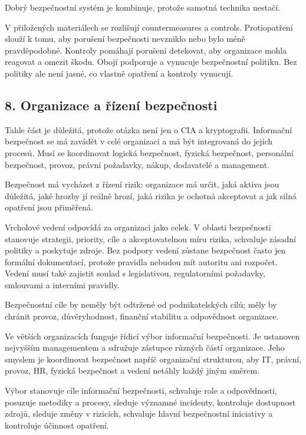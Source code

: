 Dobrý bezpečnostní systém je kombinuje, protože samotná technika nestačí.

V přiložených materiálech se rozlišují countermeasures a controls. Protiopatření slouží k tomu, aby porušení bezpečnosti nevzniklo nebo bylo méně pravděpodobné. Kontroly pomáhají porušení detekovat, aby organizace mohla reagovat a omezit škodu. Obojí podporuje a vynucuje bezpečnostní politiku. Bez politiky ale není jasné, co vlastně opatření a kontroly vynucují.

\subsection*{8. Organizace a řízení bezpečnosti}

Tahle část je důležitá, protože otázka není jen o CIA a kryptografii. Informační bezpečnost se má zavádět v celé organizaci a má být integrovaná do jejích procesů. Musí se koordinovat logická bezpečnost, fyzická bezpečnost, personální bezpečnost, provoz, právní požadavky, nákup, dodavatelé a management.

Bezpečnost má vycházet z řízení rizik: organizace má určit, jaká aktiva jsou důležitá, jaké hrozby jí reálně hrozí, jaká rizika je ochotná akceptovat a jak silná opatření jsou přiměřená.

Vrcholové vedení odpovídá za organizaci jako celek. V oblasti bezpečnosti stanovuje strategii, priority, cíle a akceptovatelnou míru rizika, schvaluje zásadní politiky a poskytuje zdroje. Bez podpory vedení zůstane bezpečnost často jen formální dokumentací, protože pravidla nebudou mít autoritu ani rozpočet. Vedení musí také zajistit soulad s legislativou, regulatorními požadavky, smlouvami a interními pravidly.

Bezpečnostní cíle by neměly být odtržené od podnikatelských cílů; měly by chránit provoz, důvěryhodnost, finanční stabilitu a odpovědnost organizace.

Ve větších organizacích funguje řídicí výbor informační bezpečnosti. Je ustanoven nejvyšším managementem a sdružuje zástupce různých částí organizace. Jeho smyslem je koordinovat bezpečnost napříč organizační strukturou, aby IT, právní, provoz, HR, fyzická bezpečnost a vedení netáhly každý jiným směrem.

Výbor stanovuje cíle informační bezpečnosti, schvaluje role a odpovědnosti, posuzuje metodiky a procesy, sleduje významné incidenty, kontroluje dostupnost zdrojů, sleduje změny v rizicích, schvaluje hlavní bezpečnostní iniciativy a kontroluje účinnost opatření.

